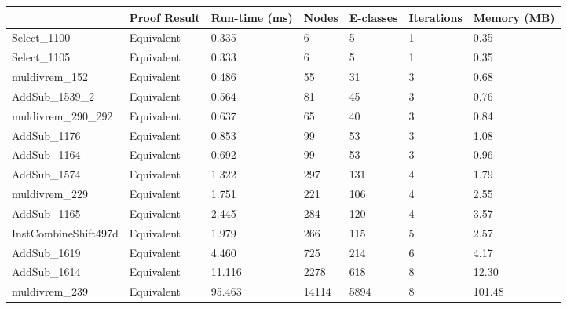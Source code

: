 \begin{tabular}{lllllll}
\toprule
 & Proof Result & Run-time (ms) & Nodes & E-classes & Iterations & Memory (MB) \\
\midrule
Select\_1100 & Equivalent & 0.335 & 6 & 5 & 1 & 0.35 \\
Select\_1105 & Equivalent & 0.333 & 6 & 5 & 1 & 0.35 \\
muldivrem\_152 & Equivalent & 0.486 & 55 & 31 & 3 & 0.68 \\
AddSub\_1539\_2 & Equivalent & 0.564 & 81 & 45 & 3 & 0.76 \\
muldivrem\_290\_292 & Equivalent & 0.637 & 65 & 40 & 3 & 0.84 \\
AddSub\_1176 & Equivalent & 0.853 & 99 & 53 & 3 & 1.08 \\
AddSub\_1164 & Equivalent & 0.692 & 99 & 53 & 3 & 0.96 \\
AddSub\_1574 & Equivalent & 1.322 & 297 & 131 & 4 & 1.79 \\
muldivrem\_229 & Equivalent & 1.751 & 221 & 106 & 4 & 2.55 \\
AddSub\_1165 & Equivalent & 2.445 & 284 & 120 & 4 & 3.57 \\
InstCombineShift497d & Equivalent & 1.979 & 266 & 115 & 5 & 2.57 \\
AddSub\_1619 & Equivalent & 4.460 & 725 & 214 & 6 & 4.17 \\
AddSub\_1614 & Equivalent & 11.116 & 2278 & 618 & 8 & 12.30 \\
muldivrem\_239 & Equivalent & 95.463 & 14114 & 5894 & 8 & 101.48 \\
\bottomrule
\end{tabular}
